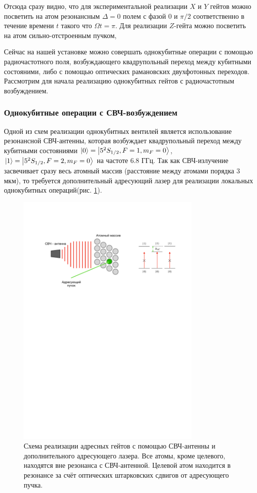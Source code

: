 Отсюда сразу видно, что для экспериментальной реализации $X$ и $Y$ гейтов можно посветить на атом резонансным $\Delta = 0$ полем с фазой $0$ и $\pi/2$ соответственно в течение времени $t$ такого что $\Omega t = \pi$. Для реализации $Z$-гейта можно посветить на атом сильно-отстроенным пучком, 

Сейчас на нашей установке можно совершать однокубитные операции с помощью радиочастотного поля, возбуждающего квадрупольный переход между кубитными состояними, либо с помощью оптических рамановских двухфотонных переходов. Рассмотрим для начала реализацию однокубитных гейтов с радиочастотным возбуждением.

\subsubsection{Однокубитные операции с СВЧ-возбуждением}

Одной из схем реализации однокубитных вентилей является использование резонансной СВЧ-антенны, которая возбуждает квадрупольный переход между кубитными состояниями $\left| 0 \right\rangle=\left| 5^2S_{1/2},F=1,m_F=0 \right\rangle$, $\left| 1 \right\rangle=\left| 5^2S_{1/2},F=2,m_F=0 \right\rangle$ на частоте $6.8 \text{ ГГц}$. Так как СВЧ-излучение засвечивает сразу весь атомный массив (расстояние между атомами порядка $3$ мкм), то требуется дополнительный адресующий лазер для реализации локальных однокубитных операций(рис. \ref{fig:shf_scheme}). 

\begin{figure}[ht]
	\centering
	\includegraphics[width=0.8\textwidth]{images/shf_gates.pdf}
	\caption{Схема реализации адресных гейтов с помощью СВЧ-антенны и дополнительного адресующего лазера. Все атомы, кроме целевого, находятся вне резонанса с СВЧ-антенной. Целевой атом находится в резонансе за счёт оптических штарковских сдвигов от адресующего пучка.}
	\label{fig:shf_scheme}
\end{figure}

